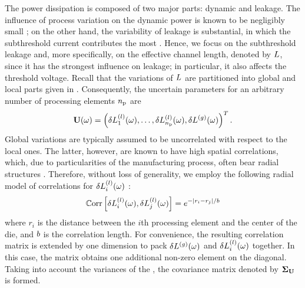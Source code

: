 The power dissipation is composed of two major parts: dynamic and leakage. The influence of process variation on the dynamic power is known to be negligibly small \cite{juan2011, juan2012, srivastava2010}; on the other hand, the variability of leakage is substantial, in which the subthreshold current contributes the most \cite{juan2011, juan2012}. Hence, we focus on the subthreshold leakage and, more specifically, on the effective channel length, denoted by $L$, since it has the strongest influence on leakage; in particular, it also affects the threshold voltage. Recall that the variations of $L$ are partitioned into global and local parts given in . Consequently, the uncertain parameters for an arbitrary number of processing elements ${n_\text{p}}$ are
\[
  \mathbf{U}(\omega) = \left(\delta L^{(l)}_1(\omega), \dotsc, \delta L^{(l)}_{n_\text{p}}(\omega), {\delta L^{(g)}}(\omega) \right)^T.
\]
Global variations are typically assumed to be uncorrelated with respect to the local ones. The latter, however, are known to have high spatial correlations, which, due to particularities of the manufacturing process, often bear radial structures \cite{friedberg2005, cheng2011}. Therefore, without loss of generality, we employ the following radial model of correlations for $\delta L^{(l)}_i(\omega)$ \cite{ghanem1991, ghanta2006}:
\begin{equation} \elabel{covariance-function}
  \oCorr{\lLeff_i(\o), \lLeff_j(\o)} = e^{-|r_i - r_j|/\corrLength}
\end{equation}
where $r_i$ is the distance between the $i$th processing element and the center of the die, and $b$ is the correlation length. For convenience, the resulting correlation matrix is extended by one dimension to pack ${\delta L^{(g)}}(\omega)$ and $\delta L^{(l)}_i(\omega)$ together. In this case, the matrix obtains one additional non-zero element on the diagonal. Taking into account the variances of the \rvs, the covariance matrix denoted by $\mCov_\vU$ is formed.
